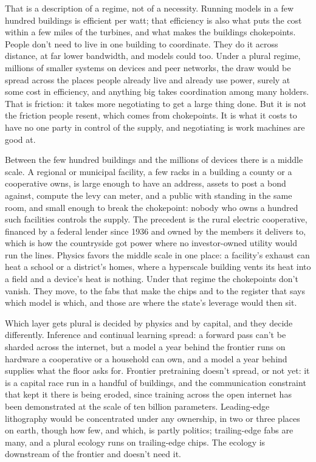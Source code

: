 That is a description of a regime, not of a necessity. Running models in a few hundred buildings is efficient per watt; that efficiency is also what puts the cost within a few miles of the turbines, and what makes the buildings chokepoints. People don't need to live in one building to coordinate. They do it across distance, at far lower bandwidth, and models could too. Under a plural regime, millions of smaller systems on devices and peer networks, the draw would be spread across the places people already live and already use power, surely at some cost in efficiency, and anything big takes coordination among many holders. That is friction: it takes more negotiating to get a large thing done. But it is not the friction people resent, which comes from chokepoints.
It is what it costs to have no one party in control of the supply, and negotiating is work machines are good at.

Between the few hundred buildings and the millions of devices there is a middle scale. A regional or municipal facility, a few racks in a building a county or a cooperative owns, is large enough to have an address, assets to post a bond against, compute the levy can meter, and a public with standing in the same room, and small enough to break the chokepoint: nobody who owns a hundred such facilities controls the supply. The precedent is the rural electric cooperative, financed by a federal lender since 1936 and owned by the members it delivers to, which is how the countryside got power where no investor-owned utility would run the lines. Physics favors the middle scale in one place: a facility's exhaust can heat a school or a district's homes, where a hyperscale building vents its heat into a field and a device's heat is nothing. Under that regime the chokepoints don't vanish. They move, to the fabs that make the chips and to the register that says which model is which, and those are where the state's leverage would then sit.

Which layer gets plural is decided by physics and by capital, and they decide differently. Inference and continual learning spread: a forward pass can't be sharded across the internet, but a model a year behind the frontier runs on hardware a cooperative or a household can own, and a model a year behind supplies what the floor asks for. Frontier pretraining doesn't spread, or not yet: it is a capital race run in a handful of buildings, and the communication constraint that kept it there is being eroded, since training across the open internet has been demonstrated at the scale of ten billion parameters. Leading-edge lithography would be concentrated under any ownership, in two or three places on earth, though how few, and which, is partly politics; trailing-edge fabs are many, and a plural ecology runs on trailing-edge chips. The ecology is downstream of the frontier and doesn't need it.

